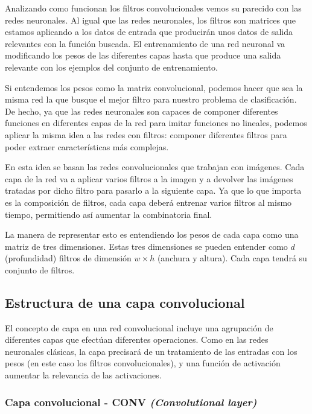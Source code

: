 Analizando como funcionan los filtros convolucionales vemos su parecido con las redes neuronales. Al igual que las redes neuronales, los filtros son matrices que estamos aplicando a los datos de entrada que producirán unos datos de salida relevantes con la función buscada. El entrenamiento de una red neuronal va modificando los pesos de las diferentes capas hasta que produce una salida relevante con los ejemplos del conjunto de entrenamiento.

Si entendemos los pesos como la matriz convolucional, podemos hacer que sea la misma red la que busque el mejor filtro para nuestro problema de clasificación. De hecho, ya que las redes neuronales son capaces de componer diferentes funciones en diferentes capas de la red para imitar funciones no lineales, podemos aplicar la misma idea a las redes con filtros: componer diferentes filtros para poder extraer características más complejas.

En esta idea se basan las redes convolucionales que trabajan con imágenes. Cada capa de la red va a aplicar varios filtros a la imagen y a devolver las imágenes tratadas por dicho filtro para pasarlo a la siguiente capa. Ya que lo que importa es la composición de filtros, cada capa deberá entrenar varios filtros al mismo tiempo, permitiendo así aumentar la combinatoria final.

\begin{center}
\end{center}

La manera de representar esto es entendiendo los pesos de cada capa como una matriz de tres dimensiones. Estas tres dimensiones se pueden entender como $d$ (profundidad) filtros de dimensión  $w \times h$ (anchura y altura). Cada capa tendrá su conjunto de filtros.

\subsection{Estructura de una capa convolucional}

El concepto de capa en una red convolucional incluye una agrupación de diferentes capas que efectúan diferentes operaciones. Como en las redes neuronales clásicas, la capa precisará de un tratamiento de las entradas con los pesos (en este caso los filtros convolucionales), y una función de activación aumentar la relevancia de las activaciones. 

\subsubsection{Capa convolucional - CONV \textit{(Convolutional layer)}}

